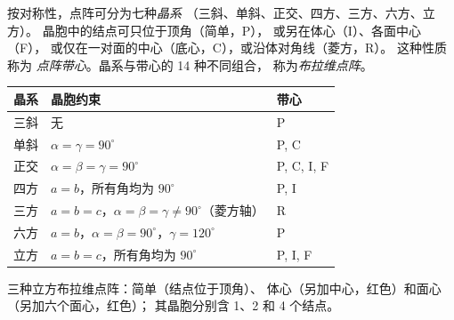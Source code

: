 \begin{definition}\label{def:b3:x-ray-diffraction:crystal-system}
按对称性，点阵可分为七种\emph{晶系}
（三斜、单斜、正交、四方、三方、六方、立方）。
晶胞中的结点可只位于顶角（简单，P），
或另在体心（I）、各面中心（F），
或仅在一对面的中心（底心，C），或沿体对角线（菱方，R）。
这种性质称为
\emph{点阵带心}。晶系与带心的 14 种不同组合，
称为\emph{布拉维点阵}。
\end{definition}

\begin{center}\small
\begin{tabular}{lll}
\hline
晶系 & 晶胞约束 & 带心 \\ \hline
三斜 & 无 & P \\
单斜 & $\alpha = \gamma = 90^\circ$ & P, C \\
正交 & $\alpha = \beta = \gamma = 90^\circ$ & P, C, I, F \\
四方 & $a = b$，所有角均为 $90^\circ$ & P, I \\
三方 & $a = b = c$，$\alpha = \beta = \gamma \ne 90^\circ$（菱方轴） & R \\
六方 & $a = b$，$\alpha = \beta = 90^\circ$，$\gamma = 120^\circ$ & P \\
立方 & $a = b = c$，所有角均为 $90^\circ$ & P, I, F \\ \hline
\end{tabular}
\end{center}

\begin{omfigure}

{\small 三种立方布拉维点阵：简单（结点位于顶角）、
体心（另加中心，红色）和面心（另加六个面心，红色）；
其晶胞分别含 1、2 和 4 个结点。}
\end{omfigure}

